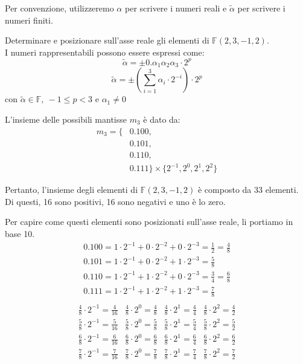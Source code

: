 \documentclass{article}
\begin{document}
Per convenzione, utilizzeremo $\alpha$ per scrivere i numeri reali e $\tilde{\alpha}$ per scrivere i numeri finiti.
\begin{example}
    Determinare e posizionare sull'asse reale gli elementi di $\mathbb{F}(2,3,-1,2)$. \\
    I numeri rappresentabili possono essere espressi come:
    $$\tilde\alpha=\pm0.\alpha_1\alpha_2\alpha_3\cdot 2^p$$
    $$\tilde\alpha=\pm(\sum_{i=1}^3\alpha_i\cdot 2^{-i})\cdot 2^p$$
    $\text{con }\tilde\alpha\in \mathbb{F},\ -1\leq p<3 \text{ e }\alpha_1\neq 0$

    L'insieme delle possibili mantisse $m_3$ è dato da:
    $$\begin{aligned}
    m_3 = \{ & 0.100, \\
             & 0.101, \\
             & 0.110, \\
             & 0.111 \} \times \{2^{-1}, 2^{0}, 2^{1}, 2^{2}\}
    \end{aligned}$$
    
    Pertanto, l'insieme degli elementi di $\mathbb{F}(2,3,-1,2)$ è composto da
    33 elementi. Di questi, 16 sono positivi, 16 sono negativi e uno è lo zero.

    Per capire come questi elementi sono posizionati sull'asse reale, li
    portiamo in base 10.
    {
    \renewcommand{\arraystretch}{1.5}
    \[
        \begin{array}{l}
            0.100 = 1\cdot2^{-1}+0\cdot2^{-2}+0\cdot2^{-3}=\frac{1}{2}=\frac{4}{8} \\ 
            0.101 = 1\cdot2^{-1}+0\cdot2^{-2}+1\cdot2^{-3}=\frac{5}{8} \\ 
            0.110 = 1\cdot2^{-1}+1\cdot2^{-2}+0\cdot2^{-3}=\frac{3}{4}=\frac{6}{8} \\ 
            0.111 = 1\cdot2^{-1}+1\cdot2^{-2}+1\cdot2^{-3}=\frac{7}{8} \\ 
        \end{array}
    \]
    \[
        \begin{array}{c|c|c|c}
            \frac{4}{8}\cdot2^{-1}=\frac{4}{16} & \frac{4}{8}\cdot2^{0}=\frac{4}{8} & \frac{4}{8}\cdot2^{1}=\frac{4}{4} & \frac{4}{8}\cdot2^{2}=\frac{4}{2}\\ 
            \frac{5}{8}\cdot2^{-1}=\frac{5}{16} & \frac{5}{8}\cdot2^{0}=\frac{5}{8} & \frac{5}{8}\cdot2^{1}=\frac{5}{4} & \frac{5}{8}\cdot2^{2}=\frac{5}{2}\\ 
            \frac{6}{8}\cdot2^{-1}=\frac{6}{16} & \frac{6}{8}\cdot2^{0}=\frac{6}{8} & \frac{6}{8}\cdot2^{1}=\frac{6}{4} & \frac{6}{8}\cdot2^{2}=\frac{6}{2}\\ 
            \frac{7}{8}\cdot2^{-1}=\frac{7}{16} & \frac{7}{8}\cdot2^{0}=\frac{7}{8} & \frac{7}{8}\cdot2^{1}=\frac{7}{4} & \frac{7}{8}\cdot2^{2}=\frac{7}{2}\\ 
        \end{array}
    \]
    }
    \begin{center}
\end{center}
\end{example}
\end{document}
